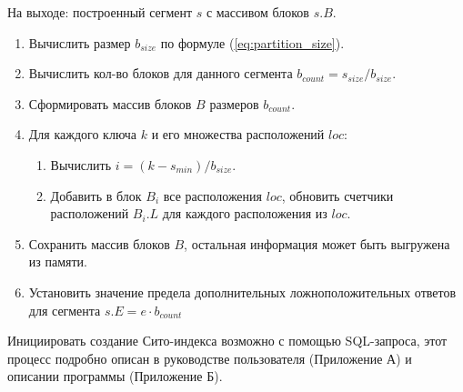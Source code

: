 На выходе: построенный сегмент $s$ с массивом блоков $s.B$.
\begin{enumerate}
    \item Вычислить размер $b_{size}$ по формуле (\ref{eq:partition_size}).
    \item Вычислить кол-во блоков для данного сегмента $b_{count} = s_{size} / b_{size}$.
    \item Сформировать массив блоков $B$ размеров $b_{count}$.
    \item Для каждого ключа $k$ и его множества расположений $loc$: 
        \begin{enumerate}
        \item Вычислить $i = (k - s_{min}) / b_{size}$.
        \item Добавить в блок $B_{i}$ все расположения $loc$, обновить счетчики расположений $B_{i}.L$ для каждого расположения из $loc$.
        \end{enumerate}
    \item Сохранить массив блоков $B$, остальная информация может быть выгружена из памяти.
    \item Установить значение предела дополнительных ложноположительных ответов для сегмента $s.E = e \cdot b_{count}$
\end{enumerate}

Инициировать создание Сито-индекса возможно с помощью SQL-запроса, этот процесс подробно описан в руководстве пользователя (Приложение А) и описании программы (Приложение Б).
